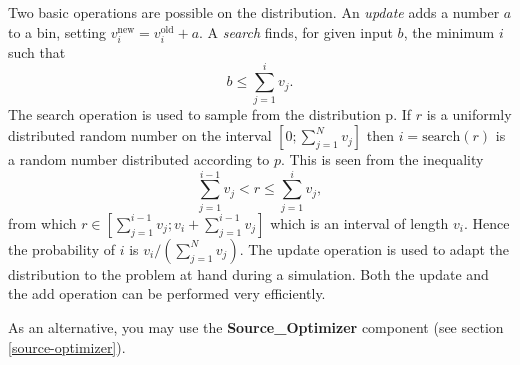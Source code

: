Two basic operations are possible on the distribution. An \emph{update}
adds a number $a$ to a bin, setting $v_i^\textrm{new} = v_i^\textrm{old} +
a$. A \emph{search} finds, for given input $b$, the minimum $i$ such
that
\begin{equation}
 b \leq \sum_{j=1}^{i} v_j.
\end{equation}
The search operation is used to sample from the distribution p. If $r$
is a uniformly distributed random number on the interval
$[0;\sum_{j=1}^N v_j]$ then $i = \textrm{search}(r)$ is a random number
distributed according to $p$. This is seen from the inequality
\begin{equation}
\sum_{j=1}^{i-1} v_j < r \leq \sum_{j=1}^{i} v_j,
\end{equation}
from which $r \in [\sum_{j=1}^{i-1} v_j; v_i + \sum_{j=1}^{i-1} v_j]$
which is an interval of length $v_i$. Hence the probability of $i$ is
$v_i/(\sum_{j=1}^N v_j)$.
The update operation is used to
adapt the distribution to the problem at hand during a simulation. Both
the update and the add operation can be performed very efficiently.

As an alternative, you may use the \textbf{Source\_Optimizer} component
(see section \ref{source-optimizer}).
